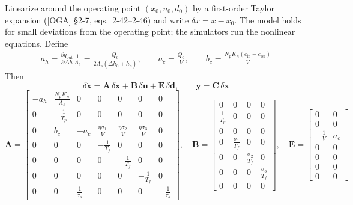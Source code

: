 \documentclass[11pt]{article}
\begin{document}
Linearize around the operating point $(x_0,u_0,d_0)$ by a first-order Taylor expansion
([OGA] §2-7, eqs.~2-42--2-46) and write $\delta x = x - x_0$. The model holds for small
deviations from the operating point; the simulators run the nonlinear equations. Define
\begin{align}
a_h = \frac{\partial q_\text{out}}{\partial\Delta h}\frac{1}{A_s} = \frac{Q_0}{2A_s(\Delta h_0+h_\rho)},
\qquad
a_c = \frac{Q_0}{V}, \qquad
b_c = \frac{N_pK_n(c_\text{in}-c_\text{ref})}{V}
\end{align}
Then
\begin{equation}
\delta\dot{\mathbf x} = \mathbf A\,\delta\mathbf x + \mathbf B\,\delta\mathbf u + \mathbf E\,\delta\mathbf d,
\qquad \mathbf y = \mathbf C\,\delta\mathbf x
\end{equation}
\begin{equation}
\mathbf A =
\begin{bmatrix}
-a_h & \frac{N_pK_n}{A_s} & 0 & 0 & 0 & 0 & 0\\
0 & -\frac{1}{T_p} & 0 & 0 & 0 & 0 & 0\\
0 & b_c & -a_c & \frac{\eta\sigma_1}{V} & \frac{\eta\sigma_2}{V} & \frac{\eta\sigma_3}{V} & 0\\
0 & 0 & 0 & -\frac{1}{T_f} & 0 & 0 & 0\\
0 & 0 & 0 & 0 & -\frac{1}{T_f} & 0 & 0\\
0 & 0 & 0 & 0 & 0 & -\frac{1}{T_f} & 0\\
0 & 0 & \frac{1}{\tau_s} & 0 & 0 & 0 & -\frac{1}{\tau_s}
\end{bmatrix},
\quad
\mathbf B =
\begin{bmatrix}
0 & 0 & 0 & 0\\
\frac{1}{T_p} & 0 & 0 & 0\\
0 & 0 & 0 & 0\\
0 & \frac{\sigma_1}{T_f} & 0 & 0\\
0 & 0 & \frac{\sigma_2}{T_f} & 0\\
0 & 0 & 0 & \frac{\sigma_3}{T_f}\\
0 & 0 & 0 & 0
\end{bmatrix},
\quad
\mathbf E =
\begin{bmatrix}
0 & 0\\ 0 & 0\\ -\frac{1}{V} & a_c\\ 0 & 0\\ 0 & 0\\ 0 & 0\\ 0 & 0
\end{bmatrix}
\end{equation}
\end{document}
